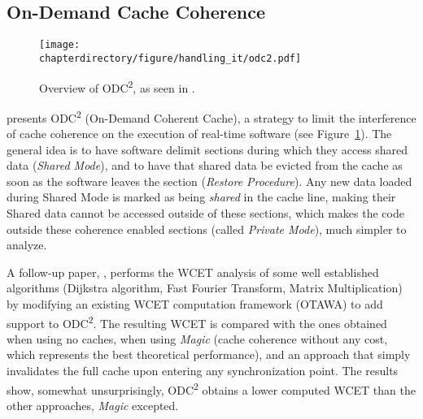 \stopallthesefloats
\subsection{On-Demand Cache Coherence}
\begin{figure}
\begin{center}
\texttt{[image: \\chapterdirectory/figure/handling\_it/odc2.pdf]}
\end{center}
\caption{Overview of ODC\textsuperscript{2}, as seen in \cite{doi:10.1002/cpe.3172}.}%
\label{fig:handling_it:odc2}
\end{figure}

\cite{doi:10.1002/cpe.3172} presents ODC\textsuperscript{2} (On-Demand Coherent
Cache), a strategy to limit the interference of cache coherence on the
execution of real-time software (see Figure~\ref{fig:handling_it:odc2}). The
general idea is to have software delimit sections during which they access
shared data (\textit{Shared Mode}), and to have that shared data be evicted
from the cache as soon as the software leaves the section (\textit{Restore
Procedure}). Any new data loaded during Shared Mode is marked as being
\textit{shared} in the cache line, making their Shared data cannot be accessed
outside of these sections, which makes the code outside these coherence enabled
sections (called \textit{Private Mode}), much simpler to analyze.

A follow-up paper, \cite{Py2015.1}, performs the WCET analysis of some well
established algorithms (Dijkstra algorithm, Fast Fourier Transform, Matrix
Multiplication) by modifying an existing WCET computation framework (OTAWA) to
add support to ODC\textsuperscript{2}. The resulting WCET is compared with the
ones obtained when using no caches, when using \textit{Magic} (cache coherence
without any cost, which represents the best theoretical performance), and an
approach that simply invalidates the full cache upon entering any
synchronization point. The results show, somewhat unsurprisingly,
ODC\textsuperscript{2} obtains a lower computed WCET than the other approaches,
\textit{Magic} excepted.
